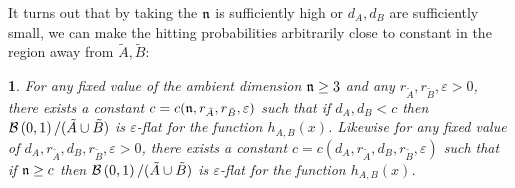 \documentclass[english, aip, jcp, priprint, graphicx,floatfix]{revtex4-1}
\theoremstyle{plain}
\newtheorem*{thm*}{\protect\theoremname}
\theoremstyle{definition}
\theoremstyle{plain}
\providecommand{\theoremname}{Theorem}
\begin{document}
It turns out that by taking the ${\mathfrak{n}}$ is sufficiently high or $d_A,d_B$ are sufficiently small, we can make the hitting probabilities arbitrarily close to constant in the region away from $\tilde A,\tilde B$:

\begin{thm*}  For any fixed value of the ambient dimension ${\mathfrak{n}} \geq 3$ and any $r_{\tilde{A}}, r_{\tilde{B}}, \varepsilon > 0$, there exists a constant $c=c({\mathfrak{n}}, r_{\tilde{A}}, r_{\tilde{B}}, \varepsilon)$ such that if $d_{A}, d_{B} < c$ then $\mathcal{B}\left(0, 1\right) / (\tilde{A} \cup \tilde{B})$ is $\varepsilon$-flat for the function $h_{A,B}(x)$.  Likewise for any fixed value of $d_{A}, r_{\tilde{A}}, d_{B}, r_{\tilde{B}}, \varepsilon>0$, there exists a constant $c=c(d_{A}, r_{\tilde{A}}, d_{B}, r_{\tilde{B}}, \varepsilon)$ such that if ${\mathfrak{n}} \geq c$ then $\mathcal{B}\left(0, 1\right) / (\tilde{A} \cup \tilde{B})$ is $\varepsilon$-flat for the function $h_{A,B}(x)$.
\end{thm*}
\end{document}
